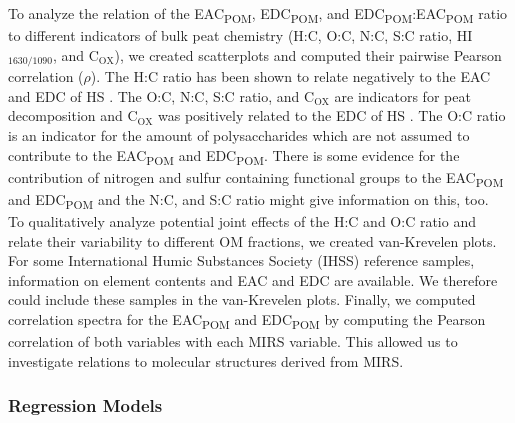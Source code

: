 \documentclass[draft,linenumbers]{agujournal2018}
\begin{document}
To analyze the relation of the EAC\textsubscript{POM},
EDC\textsubscript{POM}, and
EDC\textsubscript{POM}:EAC\textsubscript{POM} ratio to different
indicators of bulk peat chemistry (H:C, O:C, N:C, S:C ratio,
HI\(_\text{1630/1090}\), and C\(_\text{OX}\)), we created scatterplots
and computed their pairwise Pearson correlation (\(\rho\)). The H:C
ratio has been shown to relate negatively to the EAC and EDC of HS
\citep{Aeschbacher.2010, Tan.2017, Lv.2018}. The O:C, N:C, S:C ratio,
and C\(_\text{OX}\) are indicators for peat decomposition
\citep{Masiello.2008, Biester.2014, Leifeld.2012} and C\(_\text{OX}\)
was positively related to the EDC of HS \citep{Lv.2018}. The O:C ratio
is an indicator for the amount of polysaccharides \citep{Kim.2003} which
are not assumed to contribute to the EAC\textsubscript{POM} and
EDC\textsubscript{POM}. There is some evidence for the contribution of
nitrogen and sulfur containing functional groups to the
EAC\textsubscript{POM} and EDC\textsubscript{POM}
\citep{Ratasuk.2007, Fimmen.2007, HernandezMontoya.2012} and the N:C,
and S:C ratio might give information on this, too.\\
To qualitatively analyze potential joint effects of the H:C and O:C
ratio and relate their variability to different OM fractions, we created
van-Krevelen plots. For some International Humic Substances Society
(IHSS) reference samples, information on element contents
\citep{HuffmanLaboratories.NA} and EAC and EDC \citep{Aeschbacher.2012}
are available. We therefore could include these samples in the
van-Krevelen plots. Finally, we computed correlation spectra for the
EAC\textsubscript{POM} and EDC\textsubscript{POM} by computing the
Pearson correlation of both variables with each MIRS variable. This
allowed us to investigate relations to molecular structures derived from
MIRS.

\subsubsection{Regression Models}
\end{document}
